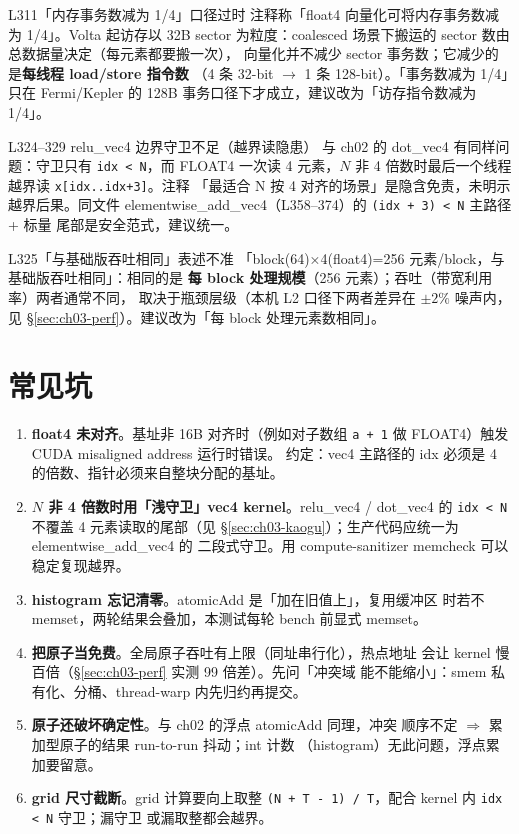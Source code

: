 \begin{kaogu}[F1]{L311「内存事务数减为 1/4」口径过时}
注释称「float4 向量化可将内存事务数减为 1/4」。Volta 起访存以 32B sector
为粒度：coalesced 场景下搬运的 sector 数由总数据量决定（每元素都要搬一次），
向量化并不减少 sector 事务数；它减少的是\textbf{每线程 load/store 指令数}
（4 条 32-bit $\to$ 1 条 128-bit）。「事务数减为 1/4」只在 Fermi/Kepler
的 128B 事务口径下才成立，建议改为「访存指令数减为 1/4」。
\end{kaogu}

\begin{kaogu}[F1]{L324--329 relu\_vec4 边界守卫不足（越界读隐患）}
与 ch02 的 dot\_vec4 有同样问题：守卫只有 \texttt{idx < N}，而 FLOAT4 一次读 4
元素，$N$ 非 4 倍数时最后一个线程越界读 \texttt{x[idx.\allowbreak{}.\allowbreak{}idx+3]}。注释
「最适合 N 按 4 对齐的场景」是隐含免责，未明示越界后果。同文件
elementwise\_add\_vec4（L358--374）的 \texttt{(idx + 3) < N} 主路径 + 标量
尾部是安全范式，建议统一。
\end{kaogu}

\begin{kaogu}[F4]{L325「与基础版吞吐相同」表述不准}
「block(64)×4(float4)=256 元素/block，与基础版吞吐相同」：相同的是
\textbf{每 block 处理规模}（256 元素）；吞吐（带宽利用率）两者通常不同，
取决于瓶颈层级（本机 L2 口径下两者差异在 $\pm 2\%$ 噪声内，见
\S\ref{sec:ch03-perf}）。建议改为「每 block 处理元素数相同」。
\end{kaogu}

\section{常见坑}

\begin{enumerate}
\item \textbf{float4 未对齐}。基址非 16B 对齐时（例如对子数组
  \texttt{a + 1} 做 FLOAT4）触发 CUDA misaligned address 运行时错误。
  约定：vec4 主路径的 idx 必须是 4 的倍数、指针必须来自整块分配的基址。
\item \textbf{$N$ 非 4 倍数时用「浅守卫」vec4 kernel}。relu\_vec4 /
  dot\_vec4 的 \texttt{idx < N} 不覆盖 4 元素读取的尾部（见
  \S\ref{sec:ch03-kaogu}）；生产代码应统一为 elementwise\_add\_vec4 的
  二段式守卫。用 compute-sanitizer memcheck 可以稳定复现越界。
\item \textbf{histogram 忘记清零}。atomicAdd 是「加在旧值上」，复用缓冲区
  时若不 memset，两轮结果会叠加，本测试每轮 bench 前显式 memset。
\item \textbf{把原子当免费}。全局原子吞吐有上限（同址串行化），热点地址
  会让 kernel 慢百倍（\S\ref{sec:ch03-perf} 实测 99 倍差）。先问「冲突域
  能不能缩小」：smem 私有化、分桶、thread-warp 内先归约再提交。
\item \textbf{原子还破坏确定性}。与 ch02 的浮点 atomicAdd 同理，冲突
  顺序不定 $\Rightarrow$ 累加型原子的结果 run-to-run 抖动；int 计数
  （histogram）无此问题，浮点累加要留意。
\item \textbf{grid 尺寸截断}。grid 计算要向上取整
  \texttt{(N + T - 1) / T}，配合 kernel 内 \texttt{idx < N} 守卫；漏守卫
  或漏取整都会越界。
\end{enumerate}


